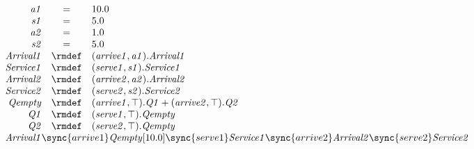 \begin{displaymath}
	\begin{array}{rcl}
		\mathit{a1} & = & 10.0\\
		\mathit{s1} & = & 5.0\\
		\mathit{a2} & = & 1.0\\
		\mathit{s2} & = & 5.0\\
[0.0ex]		\mathit{Arrival1} & \rmdef & (\mathit{arrive1},\mathit{a1}).\mathit{Arrival1}\\
		\mathit{Service1} & \rmdef & (\mathit{serve1},\mathit{s1}).\mathit{Service1}\\
		\mathit{Arrival2} & \rmdef & (\mathit{arrive2},\mathit{a2}).\mathit{Arrival2}\\
		\mathit{Service2} & \rmdef & (\mathit{serve2},\mathit{s2}).\mathit{Service2}\\
		\mathit{Qempty} & \rmdef & (\mathit{arrive1},\top).\mathit{Q1}+(\mathit{arrive2},\top).\mathit{Q2}\\
		\mathit{Q1} & \rmdef & (\mathit{serve1},\top).\mathit{Qempty}\\
		\mathit{Q2} & \rmdef & (\mathit{serve2},\top).\mathit{Qempty}\\
[0.0ex]		\multicolumn{3}{l}{\mathit{Arrival1}\sync{arrive1}\mathit{Qempty}[10.0]\sync{serve1}\mathit{Service1}\sync{arrive2}\mathit{Arrival2}\sync{serve2}\mathit{Service2}}\\
[0.0ex]	\end{array}
\end{displaymath}
